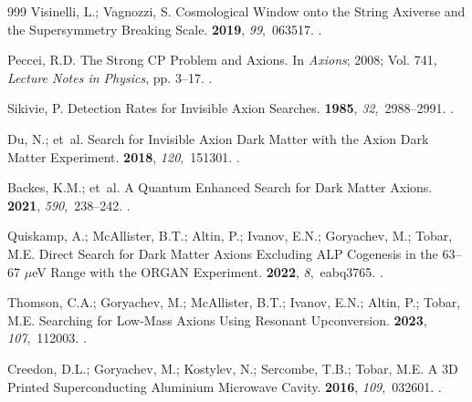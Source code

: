 \documentclass[
  aps,
  physrev,
  reprint,
  superscriptaddress,
  nofootinbib,
  amsmath,
  amssymb
]{revtex4-2}
\begin{document}
\begin{thebibliography}{999}
Visinelli, L.; Vagnozzi, S.
\newblock Cosmological Window onto the String Axiverse and the Supersymmetry
  Breaking Scale.
 {\bf 2019}, {\em 99},~063517.
.

Peccei, R.D.
\newblock The Strong {CP} Problem and Axions. In {\em Axions};  2008; Vol. 741,
  {\em Lecture Notes in Physics}, pp. 3--17.
.

Sikivie, P.
\newblock Detection Rates for Invisible Axion Searches.
 {\bf 1985}, {\em 32},~2988--2991.
.

Du, N.;  et~al.
\newblock Search for Invisible Axion Dark Matter with the Axion Dark Matter
  Experiment.
 {\bf 2018}, {\em 120},~151301.
.

Backes, K.M.;  et~al.
\newblock A Quantum Enhanced Search for Dark Matter Axions.
 {\bf 2021}, {\em 590},~238--242.
.

Quiskamp, A.; McAllister, B.T.; Altin, P.; Ivanov, E.N.; Goryachev, M.; Tobar,
  M.E.
\newblock Direct Search for Dark Matter Axions Excluding {ALP} Cogenesis in the
  {63--67 $\mu$eV} Range with the {ORGAN} Experiment.
 {\bf 2022}, {\em 8},~eabq3765.
.

Thomson, C.A.; Goryachev, M.; McAllister, B.T.; Ivanov, E.N.; Altin, P.; Tobar,
  M.E.
\newblock Searching for Low-Mass Axions Using Resonant Upconversion.
 {\bf 2023}, {\em 107},~112003.
.

Creedon, D.L.; Goryachev, M.; Kostylev, N.; Sercombe, T.B.; Tobar, M.E.
\newblock A {3D} Printed Superconducting Aluminium Microwave Cavity.
 {\bf 2016}, {\em 109},~032601.
.


\end{thebibliography}
\end{document}
